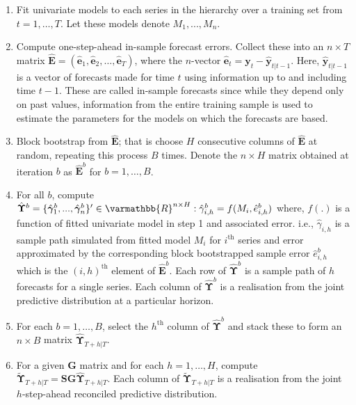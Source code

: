 \documentclass[graybox]{svmult}
\begin{document}
\begin{enumerate}
	\item Fit univariate models to each series in the hierarchy over a training set from $t=1,\dots,T$. Let these models denote ${M_1,...,M_n}$.
	\item Compute one-step-ahead in-sample forecast errors. Collect these into an $n \times T$ matrix ${\hat{\bm E}}=(\hat{\bm{e}}_1,\hat{\bm{e}}_2,\dots,\hat{\bm{e}}_T)$, where the $n$-vector $\hat{\bm{e}}_t={\bm{y}}_t-\hat{\bm {y}}_{t|t-1}$. Here, $\hat{\bm {y}}_{t|t-1}$ is a vector of forecasts made for time $t$ using information up to and including time $t-1$. These are called in-sample forecasts since while they depend only on past values, information from the entire training sample is used to estimate the parameters for the models on which the forecasts are based.
	\item Block bootstrap from $\hat{\bm{E}}$; that is choose $H$ consecutive columns of $\hat{{\bm E}}$ at random, repeating this process $B$ times. Denote the $n\times H$ matrix obtained at iteration $b$ as $\hat{{\bm E}}^b$ for $b=1,\dots,B$.
	\item For all $b$, compute $\hat{\bm\Upsilon}^b = \{\hat{\bm{\gamma}}^b_1,...,\hat{\bm{\gamma}}^b_n\}'\in \varmathbb{R}^{n\times H} : \hat{\gamma}^b_{i,h}=f(M_i, \hat{e}^b_{i,h})$ where, $f(.)$ is a function of fitted univariate model in step 1 and associated error. i.e., $\hat{\gamma}_{i,h}$ is a sample path simulated from fitted model $M_i$ for $i^\text{th}$ series and error approximated by the corresponding block bootstrapped sample error $\hat{e}^b_{i,h}$ which is the $(i,h)^\text{th}$ element of $\hat{{\bm E}}^b$. 
	Each row of $\hat{\bm \Upsilon}^b$ is a sample path of $h$ forecasts for a single series. Each column of $\hat{\bm \Upsilon}^b$ is a realisation from the joint predictive distribution at a particular horizon.
	\item For each $b=1,\dots,B$, select the $h^\text{th}$ column of $\hat{\bm \Upsilon}^b$ and stack these to form an $n\times B$ matrix $\hat{\bm{\Upsilon}}_{T+h|T}$.
	\item For a given ${\bm G}$ matrix and for each $h=1,\dots,H$, compute $\tilde{\bm{\Upsilon}}_{T+h|T}={\bm S}{\bm G}\hat{\bm{\Upsilon}}_{T+h|T}$.  Each column of $\tilde{\bm \Upsilon}_{T+h|T}$ is a realisation from the joint $h$-step-ahead reconciled predictive distribution.
\end{enumerate}
\end{document}

